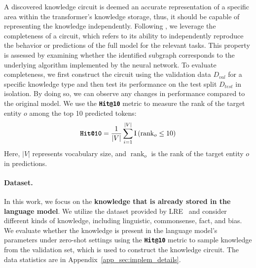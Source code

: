 A discovered knowledge circuit is deemed an accurate representation of a specific area within the transformer's knowledge storage, thus, it should be capable of representing the knowledge independently.
Following \cite{acdc}, we leverage the completeness of a circuit, which refers to its ability to independently reproduce the behavior or predictions of the full model for the relevant tasks. 
This property is assessed by examining whether the identified subgraph corresponds to the underlying algorithm implemented by the neural network. 
To evaluate completeness, we first construct the circuit using the validation data $D_{val}$ for a specific knowledge type and then test its performance on the test split $D_{test}$ in isolation. 
By doing so, we can observe any changes in performance compared to the original model. 
We use the \texttt{\textbf{Hit@10}} metric to measure the rank of the target entity $o$ among the top 10 predicted tokens:
\begin{equation}
\texttt{\textbf{Hit@10}}=\frac{1}{|V|} \sum_{i=1}^{|V|} \mathrm{I}\left(\operatorname{rank}_{o} \leq 10\right)
\end{equation}
Here, $|V|$ represents vocabulary size, and $\operatorname{rank}_{o}$ is the rank of the target entity $o$ in predictions.



\paragraph{Dataset.}
In this work, we focus on the \textbf{knowledge that is already stored in the language model}.
We utilize the dataset provided by LRE~\cite{hernandez2024linearity} and consider different kinds of knowledge, including linguistic, commonsense, fact, and bias.
We evaluate whether the knowledge is present in the language model's parameters under zero-shot settings using the \texttt{\textbf{Hit@10}} metric to sample knowledge from the validation set, which is used to construct the knowledge circuit.
The data statistics are in Appendix~\ref{app_sec:implem_details}. 

